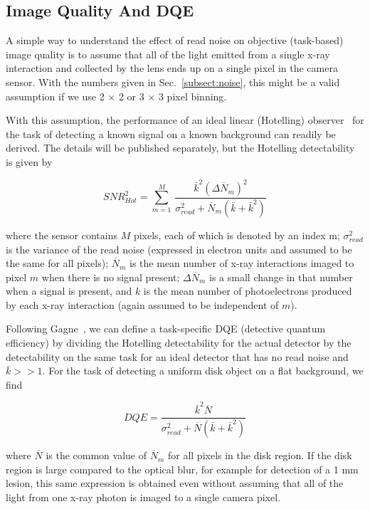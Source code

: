\subsection{Image Quality And DQE}
\label{subsect:image_quality_DQE}
A simple way to understand the effect of read noise on objective (task-based) image quality is to assume that all of the light emitted from a single x-ray interaction and collected by the lens ends up on a single pixel in the camera sensor. With the numbers given in Sec.~\ref{subsect:noise}, this might be a valid assumption if we use 2 $\times$ 2 or 3 $\times$ 3 pixel binning. 

With this assumption, the performance of an ideal linear (Hotelling) observer~\citep{Barrett2004} for the task of detecting a known signal on a known background can readily be derived. The details will be published separately, but the Hotelling detectability is given by

\begin{equation}
SNR_{Hot}^2 = \sum\limits_{m=1}^{M}\, \frac{\bar{k}^2 (\Delta \overline{N}_m)^2}{\sigma_{read}^2 + \overline{N}_m (\bar{k} + \bar{k}^2)}
\label{eq:SNR2_hot}
\end{equation}

\noindent where the sensor contains $M$ pixels, each of which is denoted by an index m; $\sigma_{read}^2$ is the variance of the read noise (expressed in electron units and assumed to be the same for all pixels); $\overline{N}_m$ is the mean number of x-ray interactions imaged to pixel $m$ when there is no signal present; $\Delta \overline{N}_m$ is a small change in that number when a signal is present, and $k$ is the mean number of photoelectrons produced by each x-ray interaction (again assumed to be independent of $m$).

Following Gagne~\citep{Gagne2003}, we can define a task-specific DQE (detective quantum efficiency) by dividing the Hotelling detectability for the actual detector by the detectability on the same task for an ideal detector that has no read noise and $\bar{k}>> 1$.  For the task of detecting a uniform disk object on a flat background, we find

\begin{equation}
DQE = \frac{\bar{k}^2 \overline{N}}{\sigma_{read}^2 + \overline{N}(\bar{k} + \bar{k}^2)}
\label{eq:DQE}
\end{equation}

\noindent where $\overline{N}$ is the common value of $\overline{N}_m$ for all pixels in the disk region. If the disk region is large compared to the optical blur, for example for detection of a 1 mm lesion, this same expression is obtained even without assuming that all of the light from one x-ray photon is imaged to a single camera pixel.

